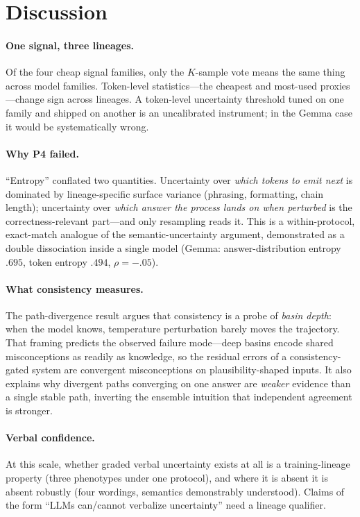 \documentclass[10pt]{article}
\begin{document}
\section{Discussion}
\paragraph{One signal, three lineages.} Of the four cheap signal families, only the $K$-sample
vote means the same thing across model families. Token-level statistics---the cheapest and
most-used proxies---change sign across lineages. A token-level uncertainty threshold tuned on
one family and shipped on another is an uncalibrated instrument; in the Gemma case it would be
systematically wrong.

\paragraph{Why P4 failed.} ``Entropy'' conflated two quantities. Uncertainty over \emph{which
tokens to emit next} is dominated by lineage-specific surface variance (phrasing, formatting,
chain length); uncertainty over \emph{which answer the process lands on when perturbed} is the
correctness-relevant part---and only resampling reads it. This is a within-protocol, exact-match
analogue of the semantic-uncertainty argument, demonstrated as a double dissociation inside a
single model (Gemma: answer-distribution entropy $.695$, token entropy $.494$, $\rho = -.05$).

\paragraph{What consistency measures.} The path-divergence result argues that consistency is a
probe of \emph{basin depth}: when the model knows, temperature perturbation barely moves the
trajectory. That framing predicts the observed failure mode---deep basins encode shared
misconceptions as readily as knowledge, so the residual errors of a consistency-gated system are
convergent misconceptions on plausibility-shaped inputs. It also explains why divergent paths
converging on one answer are \emph{weaker} evidence than a single stable path, inverting the
ensemble intuition that independent agreement is stronger.

\paragraph{Verbal confidence.} At this scale, whether graded verbal uncertainty exists at all is
a training-lineage property (three phenotypes under one protocol), and where it is absent it is
absent robustly (four wordings, semantics demonstrably understood). Claims of the form ``LLMs
can/cannot verbalize uncertainty'' need a lineage qualifier.
\end{document}
